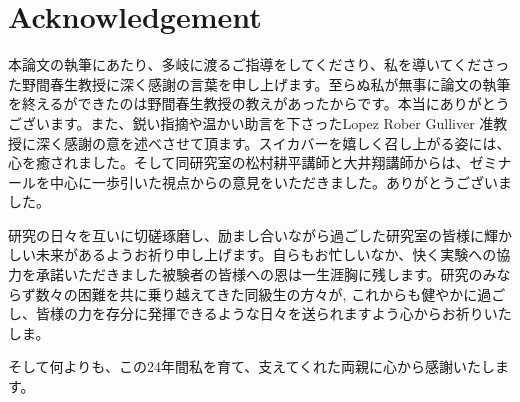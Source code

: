 \chapter*{Acknowledgement}
\par 本論文の執筆にあたり、多岐に渡るご指導をしてくださり、私を導いてくださった野間春生教授に深く感謝の言葉を申し上げます。至らぬ私が無事に論文の執筆を終えるができたのは野間春生教授の教えがあったからです。本当にありがとうございます。また、鋭い指摘や温かい助言を下さったLopez Rober Gulliver 准教授に深く感謝の意を述べさせて頂ます。スイカバーを嬉しく召し上がる姿には、心を癒されました。そして同研究室の松村耕平講師と大井翔講師からは、ゼミナールを中心に一歩引いた視点からの意見をいただきました。ありがとうございました。
\par 研究の日々を互いに切磋琢磨し、励まし合いながら過ごした研究室の皆様に輝かしい未来があるようお祈り申し上げます。自らもお忙しいなか、快く実験への協力を承諾いただきました被験者の皆様への恩は一生涯胸に残します。研究のみならず数々の困難を共に乗り越えてきた同級生の方々が, これからも健やかに過ごし、皆様の力を存分に発揮できるような日々を送られますよう心からお祈りいたしま。
\par そして何よりも、この24年間私を育て、支えてくれた両親に心から感謝いたします。
